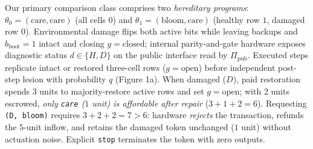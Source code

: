 \documentclass[11pt,a4paper]{article}
\begin{document}
Our primary comparison class comprises two \emph{hereditary programs}:
\(\theta_0 = (\mathrm{care}, \mathrm{care})\) (all cells \(0\)) and
\(\theta_1 = (\mathrm{bloom}, \mathrm{care})\) (healthy row \(1\),
damaged row \(0\)). Environmental damage flips both active bits while
leaving backups and \(b_{\mathrm{boot}} = 1\) intact and closing
\(g = \mathrm{closed}\); internal parity-and-gate hardware exposes
diagnostic status \(d \in \{H, D\}\) on the public interface read by
\(\Pi_{\mathrm{pub}}\). Executed steps replicate intact or restored
three-cell rows (\(g = \mathrm{open}\)) before independent post-step
lesion with probability \(q\) (Figure 1a). When damaged (\(D\)), paid
restoration spends \(3\) units to majority-restore active rows and set
\(g = \mathrm{open}\); with \(2\) units escrowed, \emph{only
\texttt{care} (\(1\) unit) is affordable after repair}
(\(3 + 1 + 2 = 6\)). Requesting \texttt{(D,\ bloom)} requires
\(3 + 2 + 2 = 7 > 6\): hardware \emph{rejects} the transaction, refunds
the \(5\)-unit inflow, and retains the damaged token unchanged (\(1\)
unit) without actuation noise. Explicit \texttt{stop} terminates the
token with zero outputs.

\end{document}

